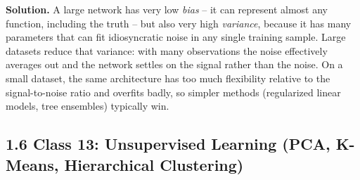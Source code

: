 \documentclass[11pt]{article}
\newcommand{\solution}[1]{%
  \par\medskip\noindent\textbf{Solution.} #1\par\medskip
}
\begin{document}
\begin{enumerate}[leftmargin=*, resume]
\solution{A large network has very low \emph{bias} -- it can represent almost any function, including the truth -- but also very high \emph{variance}, because it has many parameters that can fit idiosyncratic noise in any single training sample. Large datasets reduce that variance: with many observations the noise effectively averages out and the network settles on the signal rather than the noise. On a small dataset, the same architecture has too much flexibility relative to the signal-to-noise ratio and overfits badly, so simpler methods (regularized linear models, tree ensembles) typically win.}

\end{enumerate}


\subsection*{1.6 Class 13: Unsupervised Learning (PCA, K-Means, Hierarchical Clustering)}
\end{document}
